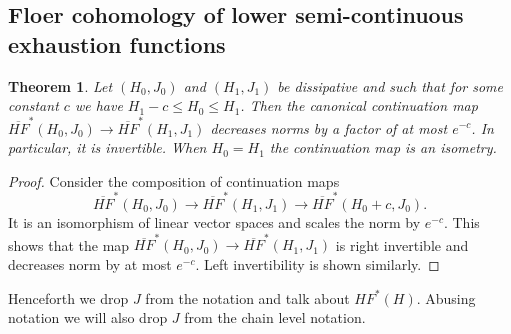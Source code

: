 \documentclass[11pt]{amsart}
\newtheorem{tm}{Theorem}[section]
\theoremstyle{definition}
\theoremstyle{remark}
\begin{document}
\subsection{Floer cohomology of lower semi-continuous exhaustion functions}
\begin{tm}\label{tmFloerInvBdd}
Let $(H_0, J_0)$ and $(H_1, J_1)$ be dissipative and such that for some constant $c$ we have $H_1-c\leq H_0\leq H_1$. Then the canonical continuation map $\overline{HF}^*(H_0,J_0)\to \overline{HF}^*(H_1,J_1)$  decreases norms by a factor of at most $e^{-c}$. In particular, it is invertible. When $H_0=H_1$ the continuation map is an isometry.
\end{tm}

\begin{proof}
Consider the composition of continuation maps
\[
\overline{HF}^*(H_0,J_0)\to \overline{HF}^*(H_1,J_1)\to \overline{HF}^* (H_0+c,J_0).
\]
It is an isomorphism of linear vector spaces and scales the norm by $e^{-c}$. This shows that the map $\overline{HF}^*(H_0,J_0)\to \overline{HF}^*(H_1,J_1)$ is right invertible and decreases norm by at most $e^{-c}$. Left invertibility is shown similarly.
\end{proof}
Henceforth we drop $J$ from the notation and talk about $HF^*(H)$. Abusing notation we will also drop $J$ from the chain level notation.
\end{document}
